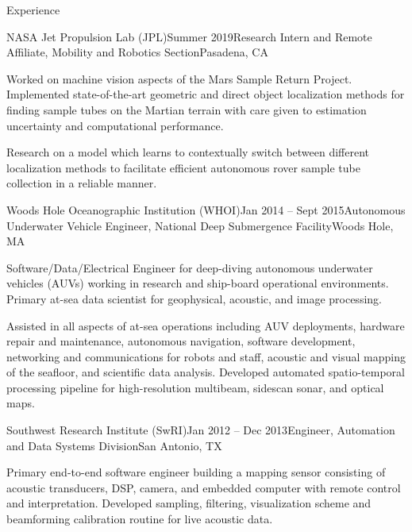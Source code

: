 \documentclass{resume} %
\begin{document}
\begin{rSection}{Experience}
\begin{rSubsection}{NASA Jet Propulsion Lab (JPL)}{Summer 2019}{Research Intern and Remote Affiliate, Mobility and Robotics Section}{Pasadena, CA}
\item{Worked on machine vision aspects of the Mars Sample Return Project. Implemented state-of-the-art geometric and direct object localization methods for finding sample tubes on the Martian terrain with care given to estimation uncertainty and computational performance.}
\item{Research on a model which learns to contextually switch between different localization methods to facilitate efficient autonomous rover sample tube collection in a reliable manner.}
\end{rSubsection}
	\vspace{-.2cm}
\begin{rSubsection}{Woods Hole Oceanographic Institution (WHOI)}{Jan 2014 -- Sept 2015}{Autonomous Underwater Vehicle Engineer, National Deep Submergence Facility}{Woods Hole, MA}
\item{Software/Data/Electrical Engineer for deep-diving autonomous underwater vehicles (AUVs) working in research and ship-board operational environments. Primary at-sea data scientist for geophysical, acoustic, and image processing.}
\item{Assisted in all aspects of at-sea operations including AUV deployments, hardware repair and maintenance, autonomous navigation, software development, networking and communications for robots and staff, acoustic and visual mapping of the seafloor, and scientific data analysis. Developed automated spatio-temporal processing pipeline for high-resolution multibeam, sidescan sonar, and optical maps.}
\end{rSubsection}
	\vspace{-.2cm}
\begin{rSubsection}{Southwest Research Institute (SwRI)}{Jan 2012 -- Dec 2013}{Engineer, Automation and Data Systems Division}{San Antonio, TX}{}
\item{Primary end-to-end software engineer building a mapping sensor consisting of acoustic transducers, DSP, camera, and embedded computer with remote control and interpretation. Developed sampling, filtering, visualization scheme and beamforming calibration routine for live acoustic data.}

\end{rSubsection}
\end{rSection}
\end{document}
